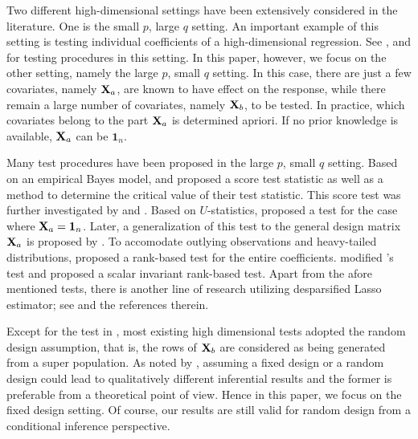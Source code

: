 \documentclass[11pt]{article}
\theoremstyle{plain}
\theoremstyle{definition}
\theoremstyle{remark}
\begin{document}
Two different high-dimensional settings have been extensively considered in the literature.
One is the small $p$, large $q$ setting.
An important example of this setting is testing individual coefficients of a high-dimensional regression.
See \cite{buhlmann2013statistical}, \cite{Zhang2013} and \cite{Lan2016} for testing procedures in this setting.
In this paper, however, we focus on the other setting, namely the large $p$, small $q$ setting.
In this case, there are just a few covariates, namely $\mathbf{X}_a$, are known to have effect on the response, while there remain a large number of covariates, namely $\mathbf{X}_b$, to be tested.
In practice, which covariates belong to the part $\mathbf{X}_a$ is determined apriori.
If no prior knowledge is available, $\mathbf{X}_a$ can be $\mathbf 1_n$.

Many test procedures have been proposed in the large $p$, small $q$ setting.
Based on an empirical Bayes model, \cite{Goeman2006} and \cite{Goeman2011} proposed a score test statistic as well as a method to determine the critical value of their test statistic.
This score test was further investigated by \cite{Lan2014Testing} and \cite{Lan2016a}.
Based on $U$-statistics,
\cite{Zhong2011Tests} proposed a test for the case where $\mathbf{X}_a=\mathbf 1_n$.
Later, a generalization of this test to the general design matrix $\mathbf{X}_a$ is proposed by \cite{Wang2015}.
To accomodate outlying observations and heavy-tailed distributions, \cite{Feng2013}
proposed a rank-based test for the entire coefficients.
\cite{Xu2016a} modified \cite{Feng2013}'s test and proposed a scalar invariant rank-based test.
Apart from the afore mentioned tests,
there is another line of research utilizing desparsified Lasso estimator; see \cite{zhang2016simultaneous} and the references therein.

Except for the test in \cite{Goeman2006}, most existing high dimensional tests adopted the random design assumption, that is, the rows of $\mathbf{X}_b$ are considered as being generated from a super population.
As noted by \cite{Lei2018}, assuming a fixed design or a random design could lead to qualitatively different inferential results and the former is preferable from a theoretical point of view.
Hence in this paper, we focus on the fixed design setting.
Of course, our results are still valid for random design from a conditional inference perspective.
\end{document}
